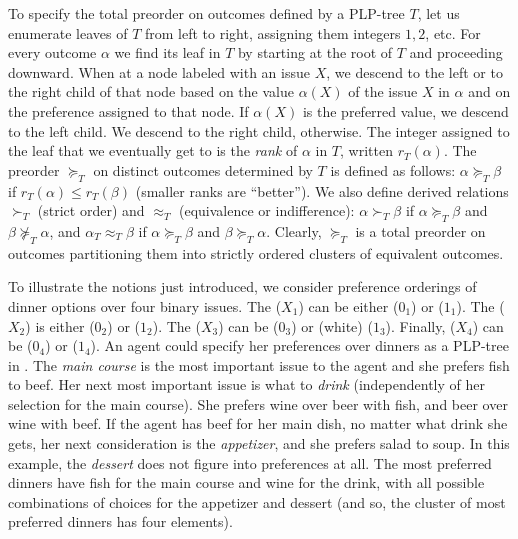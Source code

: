 To specify the total preorder on outcomes defined by a PLP-tree $T$, let 
us enumerate leaves of $T$ from left to right, assigning them 
integers $1,2$, etc. For every outcome $\alpha$ we find its leaf 
in $T$ by starting at the root of $T$ and proceeding downward. 
When at a node labeled with an issue $X$, we descend to the left or to the 
right child of that node based on the value $\alpha(X)$ of the issue $X$ 
in $\alpha$ and on the preference assigned to that node. If $\alpha(X)$ is 
the preferred value, we descend to the left child. We descend to the right
child,
otherwise. The integer assigned to the leaf that we eventually get 
to is the \emph{rank} 
of $\alpha$ in $T$, written $r_T(\alpha)$. The preorder $\succeq_T$ on 
distinct outcomes determined by $T$ is defined as follows: $\alpha\succeq_T \beta$ 
if $r_T(\alpha)\leq r_T(\beta)$ (smaller ranks are ``better''). We also 
define derived relations $\succ_T$ (strict order) and $\approx_T$ 
(equivalence or indifference): $\alpha \succ_T\beta$ if $\alpha\succeq_T
\beta$ and $\beta \not\succeq_T \alpha$, and $\alpha_T\approx_T\beta$ if 
$\alpha\succeq_T\beta$ and $\beta\succeq_T \alpha$. Clearly, $\succeq_T$ 
is a total preorder on outcomes partitioning them into strictly ordered 
clusters of equivalent outcomes. 

To illustrate the notions just introduced, we consider preference orderings 
of dinner options over four binary issues. The  ($X_1$) can 
be either  ($0_1$) or  ($1_1$). The  
($X_2$)
is either  ($0_2$) or  ($1_2$).
The  ($X_3$) can be  ($0_3$) or (white)  
($1_3$). Finally,  ($X_4$) can be  ($0_4$)
or  ($1_4$).
An agent could specify her preferences over dinners as a PLP-tree in 
. The \emph{main course} is the most important issue to 
the agent and she prefers fish to beef. Her next most important issue is 
what to \emph{drink} (independently of her selection for the main course). She 
prefers wine over beer with fish, and beer over wine with beef. If the
agent has beef for her main dish, no matter what drink she gets, her next 
consideration is the \emph{appetizer}, and she prefers salad to soup.
In this example, the \emph{dessert} does not figure into preferences at all.
The most preferred dinners have fish for the main course and wine for the 
drink, with all possible combinations of choices for the appetizer and 
dessert (and so, the cluster of most preferred dinners has four elements).

